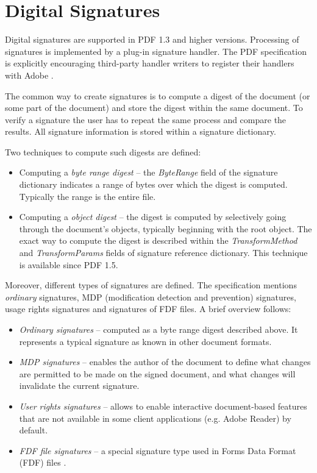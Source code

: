 \documentclass[11pt,oneside]{fithesis2}
\begin{document}
\section{Digital Signatures}
Digital signatures are supported in PDF 1.3 and higher versions. Processing of signatures is implemented by a plug-in signature handler. The PDF specification is explicitly encouraging third-party handler writers to register their handlers with Adobe \cite[p. 725]{pdf_spec}.

The common way to create signatures is to compute a digest of the document (or some part of the document) and store the digest within the same document. To verify a signature the user has to repeat the same process and compare the results. All signature information is stored within a signature dictionary.

Two techniques to compute such digests are defined:

\begin{itemize}
\setlength\itemsep{0.1em}
	\item{Computing a \textit{byte range digest} -- the \textit{ByteRange} field of the signature dictionary indicates a range of bytes over which the digest is computed. Typically the range is the entire file.}
	\item{Computing a \textit{object digest} -- the digest is computed by selectively going through the document's objects, typically beginning with the root object. The exact way to compute the digest is described within the \textit{TransformMethod} and \textit{TransformParams} fields of signature reference dictionary. This technique is available since PDF 1.5.}
\end{itemize}

Moreover, different types of signatures are defined. The specification mentions \textit{ordinary} signatures, MDP (modification detection and prevention) signatures, usage rights signatures and signatures of FDF files. A brief overview follows:

\begin{itemize}
\setlength\itemsep{0.1em}
	\item{\textit{Ordinary signatures} -- computed as a byte range digest described above. It represents a typical signature as known in other document formats.}
	\item{\textit{MDP signatures} -- enables the author of the document to define what changes are permitted to be made on the signed document, and what changes will invalidate the current signature.}
	\item{\textit{User rights signatures} -- allows to enable interactive document-based features that are not available in some client applications (e.g. Adobe Reader) by default.}
	\item{\textit{FDF file signatures} -- a special signature type used in Forms Data Format (FDF) files \cite[p. 710]{pdf_spec}.}
\end{itemize}
\end{document}
